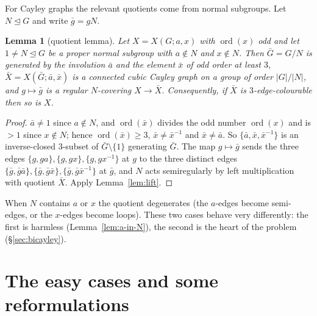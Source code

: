 \documentclass[11pt,a4paper]{article}
\newtheorem{lemma}[theorem]{Lemma}
\theoremstyle{definition}
\theoremstyle{remark}
\newcommand{\ord}{\operatorname{ord}}
\newcommand{\X}[3]{X(#1;#2,#3)}
\begin{document}
For Cayley graphs the relevant quotients come from normal subgroups.  Let $N\trianglelefteq G$ and write $\bar g=gN$.

\begin{lemma}[quotient lemma]\label{lem:cover}
Let $X=\X{G}{a}{x}$ with $\ord(x)$ odd and let $1\ne N\trianglelefteq G$ be a proper normal subgroup with $a\notin N$ and $x\notin N$.  Then $\bar G=G/N$ is generated by the involution $\bar a$ and the element $\bar x$ of odd order at least $3$, $\bar X=\X{\bar G}{\bar a}{\bar x}$ is a connected cubic Cayley graph on a group of order $|G|/|N|$, and $g\mapsto\bar g$ is a regular $N$-covering $X\to\bar X$.  Consequently, if $\bar X$ is $3$-edge-colourable then so is $X$.
\end{lemma}
\begin{proof}
$\bar a\ne1$ since $a\notin N$, and $\ord(\bar x)$ divides the odd number $\ord(x)$ and is $>1$ since $x\notin N$; hence $\ord(\bar x)\ge3$, $\bar x\ne\bar x^{-1}$ and $\bar x\ne\bar a$.  So $\{\bar a,\bar x,\bar x^{-1}\}$ is an inverse-closed $3$-subset of $\bar G\setminus\{1\}$ generating $\bar G$.  The map $g\mapsto \bar g$ sends the three edges $\{g,ga\},\{g,gx\},\{g,gx^{-1}\}$ at $g$ to the three distinct edges $\{\bar g,\bar g\bar a\},\{\bar g,\bar g\bar x\},\{\bar g,\bar g\bar x^{-1}\}$ at $\bar g$, and $N$ acts semiregularly by left multiplication with quotient $\bar X$.  Apply Lemma~\ref{lem:lift}.
\end{proof}

When $N$ contains $a$ or $x$ the quotient degenerates (the $a$-edges become semi-edges, or the $x$-edges become loops).  These two cases behave very differently: the first is harmless (Lemma~\ref{lem:a-in-N}), the second is the heart of the problem (\S\ref{sec:bicayley}).

\section{The easy cases and some reformulations}\label{sec:easy}
\end{document}
